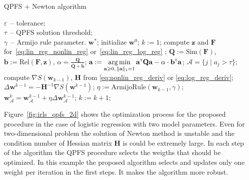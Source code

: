 \documentclass[a4paper,12pt]{article}
\renewcommand{\geq}{\ensuremath{\geqslant}}
\theoremstyle{plain} %
\theoremstyle{definition} %
\theoremstyle{remark} %
\newcommand{\ba}{\mathbf{a}}
\newcommand{\bb}{\mathbf{b}}
\newcommand{\bw}{\mathbf{w}}
\newcommand{\bz}{\mathbf{z}}
\newcommand{\cA}{\mathcal{A}}
\newcommand{\bQ}{\mathbf{Q}}
\newcommand{\bH}{\mathbf{H}}
\newcommand{\bF}{\mathbf{F}}
\newcommand{\T}{{\text{\tiny\sffamily\upshape\mdseries T}}}
\newcommand{\argmin}{\mathop{\arg \min}\limits}
\begin{document}
	\begin{algorithm}[h]
		\caption{QPFS + Newton algorithm}
		\label{QPFSNewton}
		\begin{algorithmic}
			\REQUIRE $\varepsilon$~-- tolerance;\\
			\hspace{1.53cm}$\tau$~-- QPFS solution threshold;\\
			\hspace{1.53cm}$\gamma$~-- Armijo rule parameter.
			\ENSURE $\bw^*$;
			\STATE  initialize $\bw^0$;
			\STATE $k := 1$;
			\REPEAT
			\STATE compute $\bz$ and $\bF$ for~\eqref{eq:lin_reg_nonlin_reg} or~\eqref{eq:lin_reg_log_reg} ;
			\vspace{0.1cm}
			\STATE $\bQ := \text{Sim} (\bF)$, $\bb := \text{Rel}(\bF, \bz)$, $\alpha = \frac{\overline{\bQ}}{\overline{\bQ} + \overline{\bb}}$;
			\vspace{0.1cm}
			\STATE $\ba := \argmin_{\ba \geq 0, \, \|\ba\|_1=1}\ba^{\T} \bQ \ba - \alpha \cdot \mathbf{b}^{\T} \ba$;
			\vspace{0.1cm}
			\STATE $\cA = \{j \mid a_j > \tau\}$;
			\vspace{0.1cm}
			\STATE compute $\nabla S(\bw_{k-1})$, $\bH$ from \eqref{eq:nonlin_reg_deriv} or \eqref{eq:log_reg_deriv};
			\vspace{0.1cm}
			\STATE $\Delta \bw^{k-1} = - \bH^{-1} \nabla S(\bw^{k-1})$;
			\vspace{0.1cm}
			\STATE $\eta := \text{ArmijoRule}(\bw_{k-1}, \gamma)$;
			\vspace{0.1cm}
			\STATE $\bw_{\cA}^k = \bw_{\cA}^{k - 1} + \eta \Delta \bw_{\cA}^{k - 1}$;
			\vspace{0.1cm}
			\STATE $k := k + 1$;
			\vspace{0.1cm}
			\UNTIL{$\frac{\| \bw^k - \bw^{k-1} \|}{\| \bw^k \|} < \varepsilon$}
		\end{algorithmic}
	\end{algorithm}

	Figure~\ref{fig:irls_qpfs_2d} shows the optimization process for the proposed procedure in the case of logistic regression with two model parameters. 
	Even for two-dimensional problem the solution of Newton method is unstable and the condition number of Hessian matrix $\bH$ is could be extremely large. 
	In each step of the algorithm the QPFS procedure selects the weigths that should be optimized. In this example the proposed algorithm selects and updates only one weight per iteration in the first steps. It makes the algorithm more robust.
	
\end{document}
